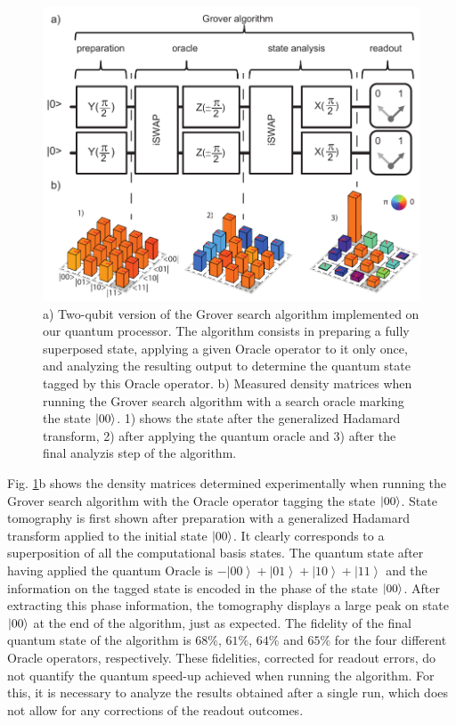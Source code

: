 %
\begin{figure}[ht!]
\centering \includegraphics[width=1\textwidth]{material/figures/2-qubit-processor/grover/grover_schematic_and_density_matrices}
\caption[Schematic of the Grover search algorithm and measured density matrices when running it]{a) Two-qubit version of the Grover search algorithm  implemented on our quantum processor. The algorithm consists in preparing a fully superposed
state, applying a given Oracle operator to it only
once, and analyzing the resulting output to determine the quantum
state tagged by this Oracle operator. b) Measured density matrices when running the Grover search algorithm
with a search oracle marking the state $\left| 00 \right>$. 1) shows the state
after the generalized Hadamard transform, 2) after applying the quantum
oracle and 3) after the final analyzis step of the algorithm.}


\label{fig:grover_algorithm_schematic_and_density_matrices} %
\end{figure}


Fig. \ref{fig:grover_algorithm_schematic_and_density_matrices}b
shows the density matrices determined experimentally when running
the Grover search algorithm with the Oracle operator tagging the
state $\left| 00 \right>$. State tomography is first shown after preparation
with a generalized Hadamard transform applied to the initial state
$\left| 00 \right>$. It clearly corresponds to a superposition of all
the computational basis states. The quantum state after having applied the quantum
Oracle is $-\left|00\right\rangle +\left|01\right\rangle +\left|10\right\rangle +\left|11\right\rangle $
and the information on the tagged state is encoded in the phase of the state $\left| 00 \right>$. After extracting this phase information, the tomography displays a large peak on state $\left| 00 \right>$ at the end of the algorithm, just as expected. The fidelity of the final quantum state of the algorithm
is $68\%$, $61\%$, $64\%$ and $65\%$ for the four different Oracle
operators, respectively. These fidelities, corrected for readout errors,
do not quantify the quantum speed-up achieved when running the algorithm. For this, it is necessary to analyze the results obtained
after a single run, which does not allow for any corrections of the
readout outcomes.


